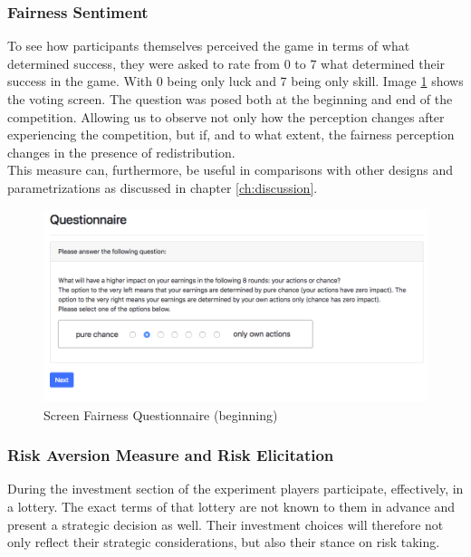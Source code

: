     \subsubsection{Fairness Sentiment}
    
    To see how participants themselves perceived the game in terms of what determined success, they were asked to rate from 0 to 7 what determined their success in the game. With 0 being only luck and 7 being only skill. Image \ref{fig:fair_q} shows the voting screen. The question was posed both at the beginning and end of the competition. Allowing us to observe not only how the perception changes after experiencing the competition, but if, and to what extent, the fairness perception changes in the presence of redistribution.\\
    
    This measure can, furthermore, be useful in comparisons with other designs and parametrizations as discussed in chapter \ref{ch:discussion}.
    
    \begin{figure}
        \centering
        \includegraphics[width=\textwidth]{graphs/Fairness_Q_Begin.png}
        \caption{Screen Fairness Questionnaire (beginning)}
        \label{fig:fair_q}
    \end{figure}
    
        
    \subsubsection{Risk Aversion Measure and Risk Elicitation}
    
    During the investment section of the experiment players participate, effectively, in a lottery. The exact terms of that lottery are not known to them in advance and present a strategic decision as well. Their investment choices will therefore not only reflect their strategic considerations, but also their stance on risk taking.\\
    
